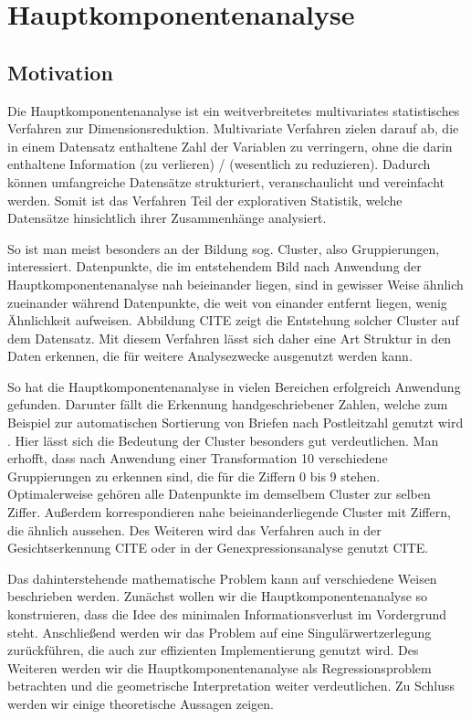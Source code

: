 \chapter{Hauptkomponentenanalyse}

\label{pca}

\section{Motivation}

Die Hauptkomponentenanalyse ist ein weitverbreitetes multivariates statistisches Verfahren zur Dimensionsreduktion. Multivariate Verfahren zielen darauf ab, die in einem Datensatz enthaltene Zahl der Variablen zu verringern, ohne die darin enthaltene Information (zu verlieren) / (wesentlich zu reduzieren). Dadurch können umfangreiche Datensätze strukturiert, veranschaulicht und vereinfacht werden. Somit ist das Verfahren Teil der explorativen Statistik, welche Datensätze hinsichtlich ihrer Zusammenhänge analysiert.

So ist man meist besonders an der Bildung sog. Cluster, also Gruppierungen, interessiert. Datenpunkte, die im entstehendem Bild nach Anwendung der Hauptkomponentenanalyse nah beieinander liegen, sind in gewisser Weise ähnlich zueinander während Datenpunkte, die weit von einander entfernt liegen, wenig Ähnlichkeit aufweisen. Abbildung CITE zeigt die Entstehung solcher Cluster auf dem Datensatz. Mit diesem Verfahren lässt sich daher eine Art Struktur in den Daten erkennen, die für weitere Analysezwecke ausgenutzt werden kann.

So hat die Hauptkomponentenanalyse in vielen Bereichen erfolgreich Anwendung gefunden. Darunter fällt die Erkennung handgeschriebener Zahlen, welche zum Beispiel zur automatischen Sortierung von Briefen nach Postleitzahl genutzt wird \cite{hastie_elements}. Hier lässt sich die Bedeutung der Cluster besonders gut verdeutlichen. Man erhofft, dass nach Anwendung einer Transformation 10 verschiedene Gruppierungen zu erkennen sind, die für die Ziffern 0 bis 9 stehen. Optimalerweise gehören alle Datenpunkte im demselbem Cluster zur selben Ziffer. Außerdem korrespondieren nahe beieinanderliegende Cluster mit Ziffern, die ähnlich aussehen. Des Weiteren wird das Verfahren auch in der Gesichtserkennung CITE oder in der Genexpressionsanalyse genutzt CITE.

Das dahinterstehende mathematische Problem kann auf verschiedene Weisen beschrieben werden. Zunächst wollen wir die Hauptkomponentenanalyse so konstruieren, dass die Idee des minimalen Informationsverlust im Vordergrund steht. Anschließend werden wir das Problem auf eine Singulärwertzerlegung zurückführen, die auch zur effizienten Implementierung genutzt wird. Des Weiteren werden wir die Hauptkomponentenanalyse als Regressionsproblem betrachten und die geometrische Interpretation weiter verdeutlichen. Zu Schluss werden wir einige theoretische Aussagen zeigen.

